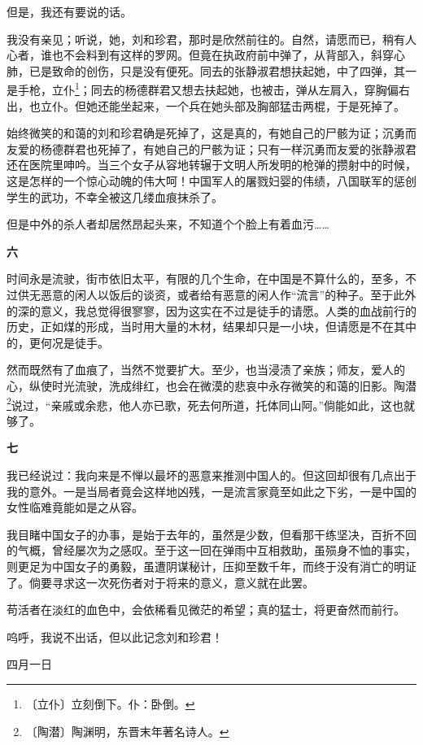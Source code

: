 \documentclass[12pt,UTF-8,openany]{ctexbook}
\begin{document}
\begin{normalsize}
    但是，我还有要说的话。
    
    我没有亲见；听说，她，刘和珍君，那时是欣然前往的。自然，请愿而已，稍有人心者，谁也不会料到有这样的罗网。但竟在执政府前中弹了，从背部入，斜穿心肺，已是致命的创伤，只是没有便死。同去的张静淑君想扶起她，中了四弹，其一是手枪，立仆\footnote{〔立仆〕立刻倒下。仆：卧倒。}；同去的杨德群君又想去扶起她，也被击，弹从左肩入，穿胸偏右出，也立仆。但她还能坐起来，一个兵在她头部及胸部猛击两棍，于是死掉了。
    
    始终微笑的和蔼的刘和珍君确是死掉了，这是真的，有她自己的尸骸为证；沉勇而友爱的杨德群君也死掉了，有她自己的尸骸为证；只有一样沉勇而友爱的张静淑君还在医院里呻吟。当三个女子从容地转辗于文明人所发明的枪弹的攒射中的时候，这是怎样的一个惊心动魄的伟大呵！中国军人的屠戮妇婴的伟绩，八国联军的惩创学生的武功，不幸全被这几缕血痕抹杀了。
    
    但是中外的杀人者却居然昂起头来，不知道个个脸上有着血污……
    
    \begin{center}\textbf{六}\end{center}
    
    时间永是流驶，街市依旧太平，有限的几个生命，在中国是不算什么的，至多，不过供无恶意的闲人以饭后的谈资，或者给有恶意的闲人作“流言”的种子。至于此外的深的意义，我总觉得很寥寥，因为这实在不过是徒手的请愿。人类的血战前行的历史，正如煤的形成，当时用大量的木材，结果却只是一小块，但请愿是不在其中的，更何况是徒手。
    
    然而既然有了血痕了，当然不觉要扩大。至少，也当浸渍了亲族；师友，爱人的心，纵使时光流驶，洗成绯红，也会在微漠的悲哀中永存微笑的和蔼的旧影。陶潜\footnote{〔陶潜〕陶渊明，东晋末年著名诗人。}说过，“亲戚或余悲，他人亦已歌，死去何所道，托体同山阿。”倘能如此，这也就够了。
    
    \begin{center}\textbf{七}\end{center}
    
    我已经说过：我向来是不惮以最坏的恶意来推测中国人的。但这回却很有几点出于我的意外。一是当局者竟会这样地凶残，一是流言家竟至如此之下劣，一是中国的女性临难竟能如是之从容。
    
    我目睹中国女子的办事，是始于去年的，虽然是少数，但看那干练坚决，百折不回的气概，曾经屡次为之感叹。至于这一回在弹雨中互相救助，虽殒身不恤的事实，则更足为中国女子的勇毅，虽遭阴谋秘计，压抑至数千年，而终于没有消亡的明证了。倘要寻求这一次死伤者对于将来的意义，意义就在此罢。
    
    苟活者在淡红的血色中，会依稀看见微茫的希望；真的猛士，将更奋然而前行。
    
    呜呼，我说不出话，但以此记念刘和珍君！
    
    \hfill 四月一日
    
\end{normalsize}
\end{document}
